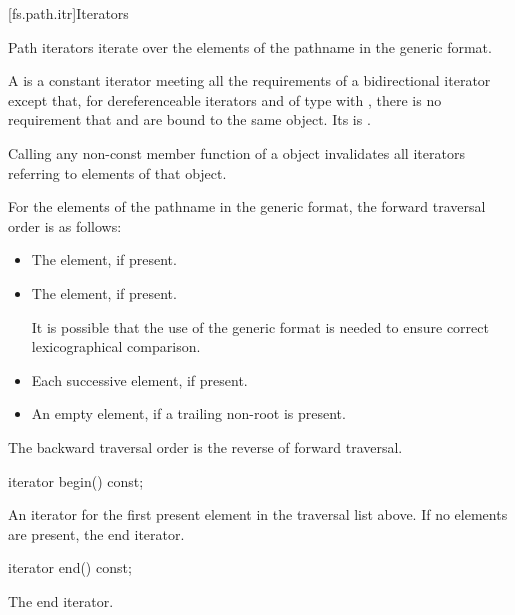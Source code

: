 [fs.path.itr]{Iterators}

%
\pnum
Path iterators iterate over the elements of the pathname
in the generic format.

\pnum
A  is a constant iterator meeting all the
requirements of a bidirectional iterator
except that,
for dereferenceable iterators  and 
of type 
with ,
there is no requirement that  and 
are bound to the same object.
Its  is .

\pnum
Calling any non-const member function of a  object
invalidates all iterators referring to elements of that object.

\pnum
For the elements of the pathname in the generic format,
the forward traversal order is as follows:
\begin{itemize}
\item The  element, if present.
\item The  element, if present.
\begin{note}
It is possible that the use of the generic format is needed
to ensure correct lexicographical comparison.
\end{note}
\item Each successive  element, if present.
\item An empty element, if a trailing non-root 
is present.
\end{itemize}

\pnum
The backward traversal order is the reverse of forward traversal.

%
\begin{itemdecl}
iterator begin() const;
\end{itemdecl}

\begin{itemdescr}
\pnum
\returns
An iterator for the first present element in the traversal
list above. If no elements are present, the end iterator.
\end{itemdescr}

%
\begin{itemdecl}
iterator end() const;
\end{itemdecl}

\begin{itemdescr}
\pnum
\returns
The end iterator.
\end{itemdescr}

